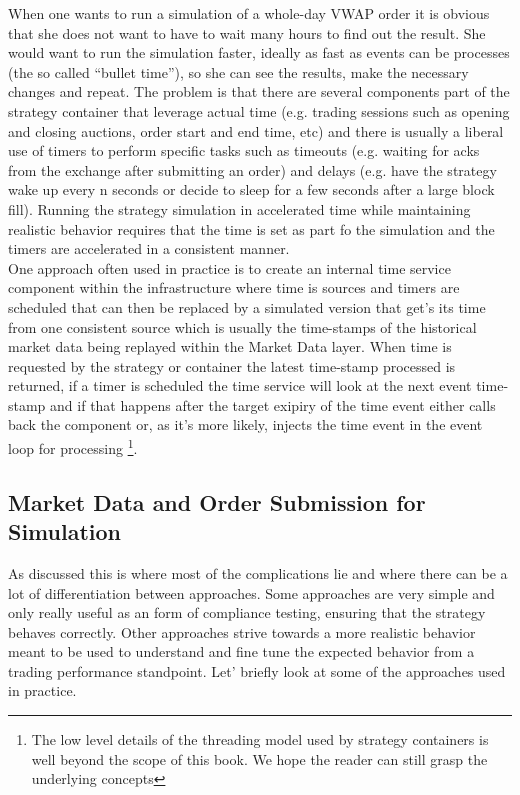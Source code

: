 When one wants to run a simulation of a whole-day VWAP order it is obvious that she does not want to have to wait many hours to find out the result. She would want to run the simulation faster, ideally as fast as events can be processes (the so called ``bullet time''), so she can see the results, make the necessary changes and repeat. The problem is that there are several components part of the strategy container that leverage actual time (e.g. trading sessions such as opening and closing auctions, order start and end time, etc) and there is usually a liberal use of timers to perform specific tasks such as timeouts (e.g. waiting for acks from the exchange after submitting an order) and delays (e.g. have the strategy wake up every n seconds or decide to sleep for a few seconds after a large block fill). Running the strategy simulation in accelerated time while maintaining realistic behavior requires that the time is set as part fo the simulation and the timers are accelerated in a consistent manner.\\

One approach often used in practice is to create an internal time service component within the infrastructure where time is sources and timers are scheduled that can then be replaced by a simulated version that get's its time from one consistent source which is usually the time-stamps of the historical market data being replayed within the Market Data layer. When time is requested by the strategy or container the latest time-stamp processed is returned, if a timer is scheduled the time service will look at the next event time-stamp and if that happens after the target exipiry of the time event either calls back the component or, as it's more likely, injects the time event in the event loop for processing \footnote{The low level details of the threading model used by strategy containers is well beyond the scope of this book. We hope the reader can still grasp the underlying concepts}.

\subsection{Market Data and Order Submission for Simulation}
As discussed this is where most of the complications lie and where there can be a lot of differentiation between approaches. Some approaches are very simple and only really useful as an form of compliance testing, ensuring that the strategy behaves correctly. Other approaches strive towards a more realistic behavior meant to be used to understand and fine tune the expected behavior from a trading performance standpoint. Let' briefly look at some of the approaches used in practice.

